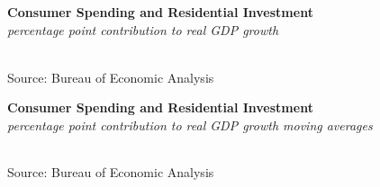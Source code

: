 \documentclass{report}
\makeatletter
\newcommand{\tbllink}[1]{\href{https://raw.githubusercontent.com/bdecon/US-chartbook/master/chartbook/data/#1}{\faTable}}
\newcommand*\short[1]{\expandafter\@gobbletwo\number\numexpr#1\relax}
\newcommand{\sbar}[4]{
		\addplot[ybar stacked, bar width=2.5pt, draw opacity=0, fill=#1] 
			table [x=#2, y=#3, col sep=comma]{#4};}
\newcommand{\stdnode}[3]{\node[below, align=left, shift=({#1,#2})]{#3};}
\newcommand{\dateaxisticks}{
		date coordinates in=x, axis line style={draw=none},
		xmax={2021-05-15},
		max space between ticks=40,	    
		xtick={{1990-01-01}, {1992-01-01}, {1994-01-01}, 
			{1996-01-01}, {1998-01-01}, {2000-01-01}, 
			{2002-01-01}, {2004-01-01}, {2006-01-01},
			{2008-01-01}, {2010-01-01}, {2012-01-01}, {2014-01-01},
		    {2016-01-01}, {2018-01-01}, {2020-01-01}},
		minor xtick={{1989-01-01}, {1991-01-01}, {1993-01-01},
			{1995-01-01}, {1997-01-01}, {1999-01-01}, 
			{2001-01-01}, {2003-01-01}, {2005-01-01}, {2007-01-01},
		    {2009-01-01}, {2011-01-01}, {2013-01-01}, {2015-01-01},
		    {2017-01-01}, {2019-01-01}, {2021-01-01}},
		enlarge y limits={0.06}, enlarge x limits={0.01},
		}
\newcommand{\bbar}[2]{extra #1 ticks = {{#2}}, extra #1 tick labels = ,
		extra #1 tick style = {grid=major, grid style={thick, black!25}},}
\newcommand{\rbars}{
		\fill[color=black!10] (axis cs:{1990-07-01},\pgfkeysvalueof{/pgfplots/ymin}) rectangle 
			(axis cs:{1991-03-01}, \pgfkeysvalueof{/pgfplots/ymax});
		\fill[color=black!10] (axis cs:{2007-12-01},\pgfkeysvalueof{/pgfplots/ymin}) rectangle 
			(axis cs:{2009-07-01}, \pgfkeysvalueof{/pgfplots/ymax});
		\fill[color=black!10] (axis cs:{2001-03-01},\pgfkeysvalueof{/pgfplots/ymin}) rectangle 
			(axis cs:{2001-11-01}, \pgfkeysvalueof{/pgfplots/ymax});
		\fill[color=black!10] (axis cs:{2020-02-01},\pgfkeysvalueof{/pgfplots/ymin}) rectangle 
			(axis cs:{2021-05-15}, \pgfkeysvalueof{/pgfplots/ymax});}
\makeatother
\begin{document}
{\begin{minipage}{0.76\textwidth}
\normalsize \textbf{Consumer Spending and Residential Investment}\\
\footnotesize{\textit{percentage point contribution to real GDP growth}}\\
\hspace*{-2mm} \\
\footnotesize{Source: Bureau of Economic Analysis} \hfill \tbllink{pce.csv}
\vspace{3mm}

\small  
\end{minipage}
\vspace{1mm}

\begin{minipage}{0.80\textwidth}
\normalsize \textbf{Consumer Spending and Residential Investment}\\
\footnotesize{\textit{percentage point contribution to real GDP growth \hspace{36mm} moving averages}}\\
 \setlength{\tabcolsep}{3.0pt} \color{black!90}
	{\renewcommand{\arraystretch}{1.55}
\hspace*{-2mm} \begin{tabular}{p{2.0mm} p{39mm} R{8.2mm} R{8.2mm} R{8.2mm} R{8.2mm} R{7.2mm} 
					R{7.8mm} R{7.2mm} R{7.2mm}}
		 \hline
	\end{tabular}}
	\vspace{-2mm}
	
\footnotesize{Source: Bureau of Economic Analysis}
\end{minipage}
\newpage 
\begin{minipage}{0.76\textwidth}
\small 
\vspace{1mm}


\end{minipage}}
\end{document}
